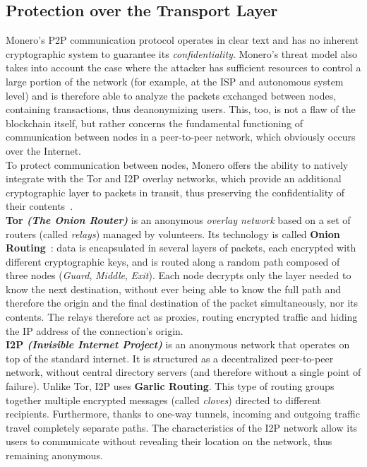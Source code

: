 \documentclass[conference]{IEEEtran}
\begin{document}
\subsection{Protection over the Transport Layer}
Monero's P2P communication protocol operates in clear text and has no inherent cryptographic system to guarantee its \textit{confidentiality}. Monero's threat model also takes into account the case where the attacker has sufficient resources to control a large portion of the network (for example, at the ISP and autonomous system level) and is therefore able to analyze the packets exchanged between nodes, containing transactions, thus deanonymizing users. This, too, is not a flaw of the blockchain itself, but rather concerns the fundamental functioning of communication between nodes in a peer-to-peer network, which obviously occurs over the Internet.\\
To protect communication between nodes, Monero offers the ability to natively integrate with the Tor and I2P overlay networks, which provide an additional cryptographic layer to packets in transit, thus preserving the confidentiality of their contents~\cite{monero_technical_specs, monero_tor_i2p, monero_connect_wallet_tor}.\\
\textbf{Tor \textit{(The Onion Router)}} is an anonymous \textit{overlay network} based on a set of routers (called \textit{relays}) managed by volunteers. Its technology is called \textbf{Onion Routing}~\cite{tor}: data is encapsulated in several layers of packets, each encrypted with different cryptographic keys, and is routed along a random path composed of three nodes (\textit{Guard}, \textit{Middle}, \textit{Exit}). Each node decrypts only the layer needed to know the next destination, without ever being able to know the full path and therefore the origin and the final destination of the packet simultaneously, nor its contents. The relays therefore act as proxies, routing encrypted traffic and hiding the IP address of the connection's origin.~\cite{tor}\\
\textbf{I2P \textit{(Invisible Internet Project)}} is an anonymous network that operates on top of the standard internet. It is structured as a decentralized peer-to-peer network, without central directory servers (and therefore without a single point of failure). Unlike Tor, I2P uses \textbf{Garlic Routing}. This type of routing groups together multiple encrypted messages (called \textit{cloves}) directed to different recipients. Furthermore, thanks to one-way tunnels, incoming and outgoing traffic travel completely separate paths. The characteristics of the I2P network allow its users to communicate without revealing their location on the network, thus remaining anonymous.~\cite{i2p}\\
\end{document}
